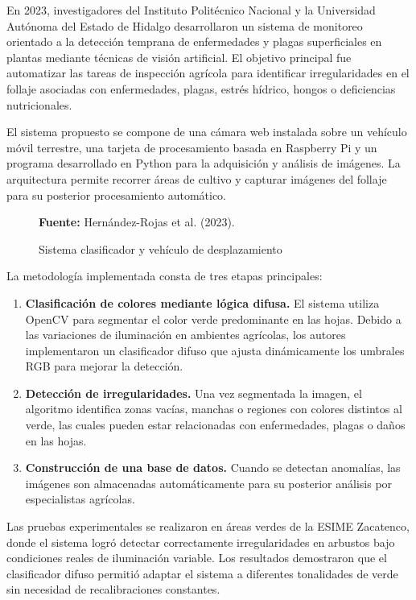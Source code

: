 En 2023, investigadores del Instituto Politécnico Nacional y la Universidad Autónoma del Estado de Hidalgo desarrollaron un sistema de monitoreo orientado a la detección temprana de enfermedades y plagas superficiales en plantas mediante técnicas de visión artificial. El objetivo principal fue automatizar las tareas de inspección agrícola para identificar irregularidades en el follaje asociadas con enfermedades, plagas, estrés hídrico, hongos o deficiencias nutricionales.

El sistema propuesto se compone de una cámara web instalada sobre un vehículo móvil terrestre, una tarjeta de procesamiento basada en Raspberry Pi y un programa desarrollado en Python para la adquisición y análisis de imágenes. La arquitectura permite recorrer áreas de cultivo y capturar imágenes del follaje para su posterior procesamiento automático.

\begin{figure}[H]
    \centering
    \caption{Sistema clasificador y vehículo de desplazamiento}
    \label{fig:1_1_5}
    \vspace{0.2cm}
    \footnotesize \textbf{Fuente:} Hernández-Rojas et al. (2023).
\end{figure}

La metodología implementada consta de tres etapas principales:

\begin{enumerate}[topsep=2pt, itemsep=4pt, parsep=0pt]
    \item \textbf{Clasificación de colores mediante lógica difusa.} El sistema utiliza OpenCV para segmentar el color verde predominante en las hojas. Debido a las variaciones de iluminación en ambientes agrícolas, los autores implementaron un clasificador difuso que ajusta dinámicamente los umbrales RGB para mejorar la detección.
    \item \textbf{Detección de irregularidades.} Una vez segmentada la imagen, el algoritmo identifica zonas vacías, manchas o regiones con colores distintos al verde, las cuales pueden estar relacionadas con enfermedades, plagas o daños en las hojas.
    \item \textbf{Construcción de una base de datos.} Cuando se detectan anomalías, las imágenes son almacenadas automáticamente para su posterior análisis por especialistas agrícolas.
\end{enumerate}

Las pruebas experimentales se realizaron en áreas verdes de la ESIME Zacatenco, donde el sistema logró detectar correctamente irregularidades en arbustos bajo condiciones reales de iluminación variable. Los resultados demostraron que el clasificador difuso permitió adaptar el sistema a diferentes tonalidades de verde sin necesidad de recalibraciones constantes.

